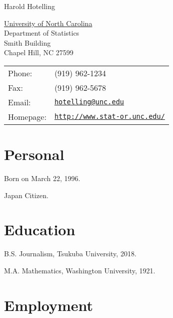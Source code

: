 \documentclass[letterpaper]{article}
\def\name{Harold Hotelling}
\renewenvironment{itemize}{
  \begin{list}{}{
    \setlength{\leftmargin}{1.5em}
  }
}{
  \end{list}
}
\begin{document}
{\huge \name}


\vspace{0.25in}

\begin{minipage}{0.45\linewidth}
  \href{http://www.unc.edu/}{University of North Carolina} \\
  Department of Statistics \\
  Smith Building \\
  Chapel Hill, NC 27599
\end{minipage}
\begin{minipage}{0.45\linewidth}
  \begin{tabular}{ll}
    Phone: & (919) 962-1234 \\
    Fax: &  (919) 962-5678 \\
    Email: & \href{mailto:hotelling@unc.edu}{\tt hotelling@unc.edu} \\
    Homepage: & \href{http://www.stat-or.unc.edu/}{\tt http://www.stat-or.unc.edu/} \\
  \end{tabular}
\end{minipage}


\section*{Personal}

\begin{itemize}
\item Born on March 22, 1996.
\item Japan Citizen.
\end{itemize}


\section*{Education}

\begin{itemize}
  \item B.S. Journalism, Tsukuba University, 2018.

  \item M.A. Mathematics, Washington University, 1921.
\end{itemize}


\section*{Employment}
\end{document}

